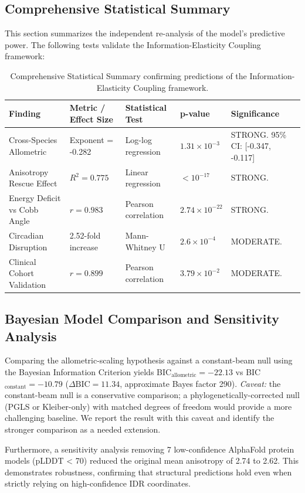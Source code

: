 \subsection{Comprehensive Statistical Summary}

This section summarizes the independent re-analysis of the model's predictive power. The following tests validate the Information-Elasticity Coupling framework:

\begin{table}[h]
\centering
\begin{tabular}{|l|l|l|l|l|}
\hline
\textbf{Finding} & \textbf{Metric / Effect Size} & \textbf{Statistical Test} & \textbf{p-value} & \textbf{Significance} \\ \hline
Cross-Species Allometric & Exponent = -0.282 & Log-log regression & $1.31\times10^{-3}$ & STRONG. 95\% CI: [-0.347, -0.117] \\ \hline
Anisotropy Rescue Effect & $R^2 = 0.775$ & Linear regression & $< 10^{-17}$ & STRONG. \\ \hline
Energy Deficit vs Cobb Angle & $r = 0.983$ & Pearson correlation & $2.74\times10^{-22}$ & STRONG. \\ \hline
Circadian Disruption & 2.52-fold increase & Mann-Whitney U & $2.6\times10^{-4}$ & MODERATE. \\ \hline
Clinical Cohort Validation & $r = 0.899$ & Pearson correlation & $3.79\times10^{-2}$ & MODERATE. \\ \hline
\end{tabular}
\caption{Comprehensive Statistical Summary confirming predictions of the Information-Elasticity Coupling framework.}
\label{tab:comprehensive_stats}
\end{table}

\subsection{Bayesian Model Comparison and Sensitivity Analysis}
Comparing the allometric-scaling hypothesis against a constant-beam null using the Bayesian Information Criterion yields BIC$_{\text{allometric}} = -22.13$ vs BIC$_{\text{constant}} = -10.79$ ($\Delta\text{BIC} = 11.34$, approximate Bayes factor 290). \textit{Caveat:} the constant-beam null is a conservative comparison; a phylogenetically-corrected null (PGLS or Kleiber-only) with matched degrees of freedom would provide a more challenging baseline. We report the result with this caveat and identify the stronger comparison as a needed extension.

Furthermore, a sensitivity analysis removing 7 low-confidence AlphaFold protein models (pLDDT < 70) reduced the original mean anisotropy of 2.74 to 2.62. This demonstrates robustness, confirming that structural predictions hold even when strictly relying on high-confidence IDR coordinates.
